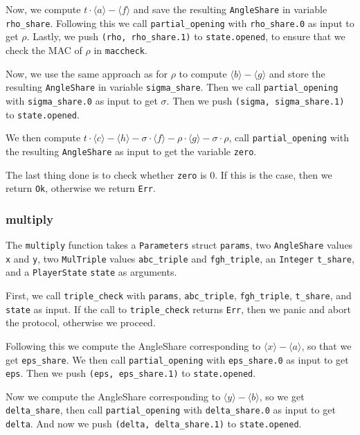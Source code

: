 \documentclass[../main.tex]{subfiles}
\begin{document}
Now, we compute $t \cdot \langle a \rangle - \langle f \rangle$ and save the resulting \lstinline{AngleShare} in variable \lstinline{rho_share}. Following this we call \lstinline{partial_opening} with \lstinline{rho_share.0} as input to get $\rho$. Lastly, we push \lstinline{(rho, rho_share.1)} to \lstinline{state.opened}, to ensure that we check the MAC of $\rho$ in \lstinline{maccheck}.

Now, we use the same approach as for $\rho$ to compute $\langle b \rangle - \langle g \rangle$ and store the resulting \lstinline{AngleShare} in variable \lstinline{sigma_share}. Then we call \lstinline{partial_opening} with \lstinline{sigma_share.0} as input to get $\sigma$. Then we push \lstinline{(sigma, sigma_share.1)} to \lstinline{state.opened}.

We then compute $t \cdot \langle c \rangle - \langle h \rangle - \sigma \cdot \langle f \rangle - \rho \cdot \langle g \rangle - \sigma \cdot \rho$, call \lstinline{partial_opening} with the resulting \lstinline{AngleShare} as input to get the variable \lstinline{zero}.

The last thing done is to check whether \lstinline{zero} is $0$. If this is the case, then we return \lstinline{Ok}, otherwise we return \lstinline{Err}.

\subsubsection{multiply}
The \lstinline{multiply} function takes a \lstinline{Parameters} struct \lstinline{params}, two \lstinline{AngleShare} values \lstinline{x} and \lstinline{y}, two \lstinline{MulTriple} values \lstinline{abc_triple} and \lstinline{fgh_triple}, an \lstinline{Integer} \lstinline{t_share}, and a \lstinline{PlayerState} \lstinline{state} as arguments.

First, we call \lstinline{triple_check} with \lstinline{params}, \lstinline{abc_triple}, \lstinline{fgh_triple}, \lstinline{t_share}, and \lstinline{state} as input. If the call to \lstinline{triple_check} returns \lstinline{Err}, then we panic and abort the protocol, otherwise we proceed.

Following this we compute the AngleShare corresponding to $\langle x \rangle - \langle a \rangle$, so that we get \lstinline{eps_share}. We then call \lstinline{partial_opening} with \lstinline{eps_share.0} as input to get \lstinline{eps}. Then we push \lstinline{(eps, eps_share.1)} to \lstinline{state.opened}.

Now we compute the AngleShare corresponding to $\langle y \rangle - \langle b \rangle$, so we get \lstinline{delta_share}, then call \lstinline{partial_opening} with \lstinline{delta_share.0} as input to get \lstinline{delta}. And now we push \lstinline{(delta, delta_share.1)} to \lstinline{state.opened}.
\end{document}
